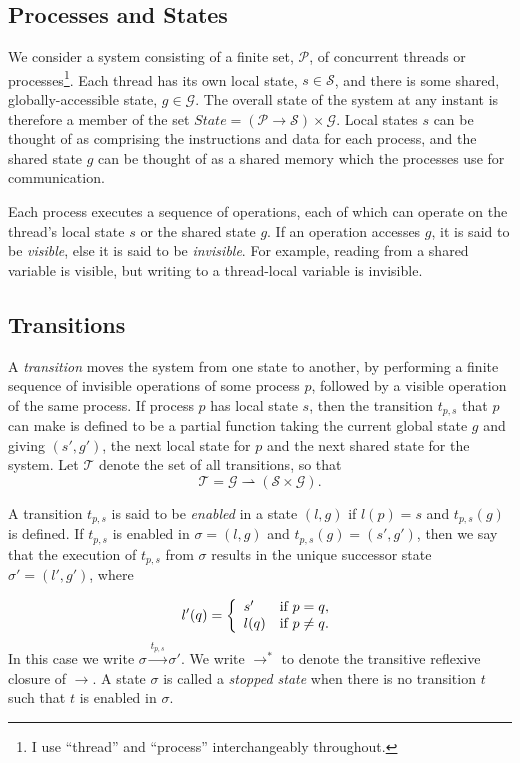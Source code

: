 \documentclass[12pt,a4paper,twoside,openright]{report}
\begin{document}
\subsection{Processes and States}
We consider a system consisting of a finite set, $\mathcal{P}$,
of concurrent threads or processes\footnote{I use ``thread'' and
``process'' interchangeably throughout.}.
Each thread has its own local state, $s \in \mathcal{S}$, and there
is some shared, globally-accessible state, $g \in \mathcal{G}$. The overall
state of the system at any instant is therefore a member of the set
$ \textit{State} = (\mathcal{P} \to \mathcal{S}) \times \mathcal{G} $.
Local states $s$ can be thought of as comprising the instructions
and data for each process, and the shared state $g$ can be thought
of as a shared memory which the processes use for communication.

Each process executes a sequence of operations, each of which can
operate on the thread's local state $s$ or the shared
state $g$. If an operation
accesses $g$, it is said to be \emph{visible}, else it is said to be
\emph{invisible}. For example, reading from a shared variable is
visible, but writing to a thread-local variable is invisible.

\subsection{Transitions}
A \emph{transition} moves the system from one state to another,
by performing a finite sequence of invisible operations of some
process $p$, followed by a visible operation of the same process.
If process $p$ has local state $s$, then the transition $t_{p,s}$
that $p$ can make is defined to be a partial function taking the current
global state $g$ and giving $(s', g')$, the next local state for $p$
and the next shared state for the system. Let $\mathcal{T}$ denote the
set of all transitions, so that
	\[\mathcal{T} = \mathcal{G} \rightharpoonup
				(\mathcal{S} \times \mathcal{G}).\]

A transition $t_{p,s}$ is said to be \emph{enabled} in a state
$(l, g)$ if $l(p) = s$ and $t_{p,s}(g)$ is defined.
If $t_{p,s}$ is enabled in $\sigma = (l, g)$ and 
$t_{p,s}(g) = (s', g')$, then we say that the
execution of $t_{p,s}$ from $\sigma$ results in the unique successor
state $\sigma' = (l', g')$, where

\[
	l'(q) = \left\{\begin{array}{lr}
				s' & \textmd{if } p = q, \\
				l(q) &\textmd{if } p \neq q.
			\end{array} \right.
\]
In this case we write $\sigma \xrightarrow{t_{p,s}} \sigma'$.
We write $\longrightarrow^*$ to denote the transitive reflexive
closure of $\longrightarrow$.
A state $\sigma$ is called a \emph{stopped state} when there is no transition
$t$ such that $t$ is enabled in $\sigma$.
\end{document}
